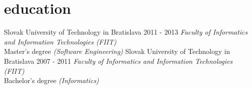 \documentclass[a4paper]{cv}
\begin{document}
\section{education}
\begin{entrylist}
	\entry
		{Slovak University of Technology in Bratislava}
		{2011 - 2013}
		{\emph{Faculty of Informatics and Information Technologies (FIIT)}\\
		Master's degree \emph{(Software Engineering)}}
	\entry
		{Slovak University of Technology in Bratislava}
		{2007 - 2011}
		{\emph{Faculty of Informatics and Information Technologies (FIIT)}\\
		Bachelor's degree \emph{(Informatics)}}
\end{entrylist}


\end{document}
